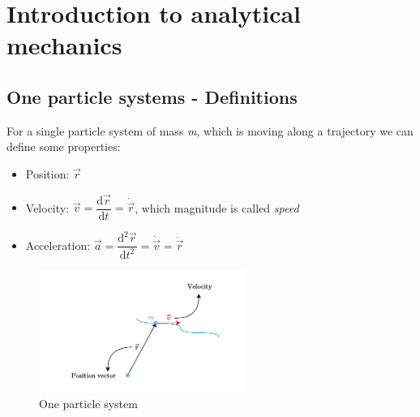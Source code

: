 \chapter{Introduction to analytical mechanics}
\section{One particle systems - Definitions}
For a single particle system of mass \textit{m}, which is moving along a trajectory we can define some properties:
\begin{itemize}
    \item Position: $\vec{r}$
    \item Velocity: $\vec{v} = \dfrac{\mathrm{d} \vec{r}}{\mathrm{d} t}=\dot{\vec{r}}$, which magnitude is called \textit{speed}
    \item Acceleration: $\vec{a}=\dfrac{\mathrm{d}^2 \vec{r}}{\mathrm{d} t^2}=\dot{\vec{v}}=\ddot{\vec{r}}$
\end{itemize}
\begin{figure}[H]
    \centering
    \includegraphics[width=0.6\textwidth]{res/svg/onepartsys.drawio}
    \caption{One particle system}
    \label{fig:image1}
\end{figure}

